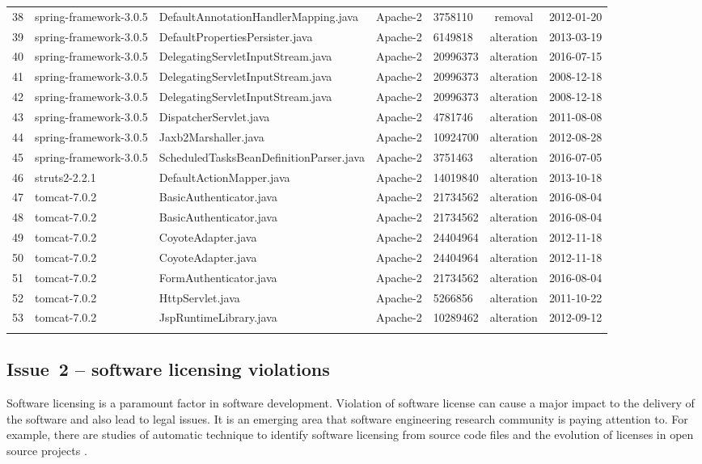 \documentclass{sig-alternate-05-2015}
\begin{document}
\begin{table}
{\begin{tabular}{r|l|l|l|l|c|l}
		38 & spring-framework-3.0.5 & DefaultAnnotationHandlerMapping.java & Apache-2 & 3758110 & removal & 2012-01-20 \\
		39 & spring-framework-3.0.5 & DefaultPropertiesPersister.java & Apache-2 & 6149818 & alteration & 2013-03-19 \\
		40 & spring-framework-3.0.5 & DelegatingServletInputStream.java & Apache-2 & 20996373 & alteration & 2016-07-15 \\
		41 & spring-framework-3.0.5 & DelegatingServletInputStream.java & Apache-2 & 20996373 & alteration & 2008-12-18 \\
		42 & spring-framework-3.0.5 & DelegatingServletInputStream.java & Apache-2 & 20996373 & alteration & 2008-12-18 \\
		43 & spring-framework-3.0.5 & DispatcherServlet.java & Apache-2 & 4781746 & alteration & 2011-08-08 \\
		44 & spring-framework-3.0.5 & Jaxb2Marshaller.java & Apache-2 & 10924700 & alteration & 2012-08-28 \\
		45 & spring-framework-3.0.5 & ScheduledTasksBeanDefinitionParser.java & Apache-2 & 3751463 & alteration & 2016-07-05 \\
		46 & struts2-2.2.1 & DefaultActionMapper.java & Apache-2 & 14019840 & alteration & 2013-10-18 \\
		47 & tomcat-7.0.2 & BasicAuthenticator.java & Apache-2 & 21734562 & alteration & 2016-08-04 \\
		48 & tomcat-7.0.2 & BasicAuthenticator.java & Apache-2 & 21734562 & alteration & 2016-08-04 \\
		49 & tomcat-7.0.2 & CoyoteAdapter.java & Apache-2 & 24404964 & alteration & 2012-11-18 \\
		50 & tomcat-7.0.2 & CoyoteAdapter.java & Apache-2 & 24404964 & alteration & 2012-11-18 \\
		51 & tomcat-7.0.2 & FormAuthenticator.java & Apache-2 & 21734562 & alteration & 2016-08-04 \\
		52 & tomcat-7.0.2 & HttpServlet.java & Apache-2 & 5266856 & alteration & 2011-10-22 \\
		53 & tomcat-7.0.2 & JspRuntimeLibrary.java & Apache-2 & 10289462 & alteration & 2012-09-12 \\
		\hline& 
	\end{tabular} %
}
\end{table}

\subsection{Issue~2 -- software licensing violations}
Software licensing is a paramount factor in software development. Violation of software license can cause a major impact to the delivery of the software and also lead to legal issues. It is an emerging area that software engineering research community is paying attention to. For example, there are studies of automatic technique to identify software licensing from source code files \cite{German2010} and the evolution of licenses in open source projects \cite{DiPenta2010}.
\end{document}
